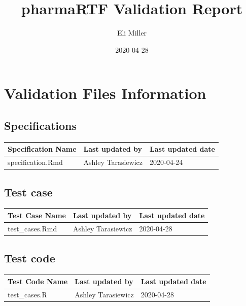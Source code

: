 \documentclass[]{article}
\title{pharmaRTF Validation Report}
\author{Eli Miller}
\date{2020-04-28}
\begin{document}
\maketitle

\newpage
\tableofcontents
\newpage

\hypertarget{validation-files-information}{%
\section{Validation Files
Information}\label{validation-files-information}}

\hypertarget{specifications}{%
\subsection{Specifications}\label{specifications}}

\begin{table}[H]
\centering
\begin{tabular}{lll}
\toprule
Specification Name & Last updated by & Last updated date\\
\midrule
\rowcolor{gray!6}  specification.Rmd & Ashley Tarasiewicz & 2020-04-24\\
\bottomrule
\end{tabular}
\end{table}

\hypertarget{test-case}{%
\subsection{Test case}\label{test-case}}

\begin{table}[H]
\centering
\begin{tabular}{lll}
\toprule
Test Case Name & Last updated by & Last updated date\\
\midrule
\rowcolor{gray!6}  test\_cases.Rmd & Ashley Tarasiewicz & 2020-04-28\\
\bottomrule
\end{tabular}
\end{table}

\hypertarget{test-code}{%
\subsection{Test code}\label{test-code}}

\begin{table}[H]
\centering
\begin{tabular}{lll}
\toprule
Test Code Name & Last updated by & Last updated date\\
\midrule
\rowcolor{gray!6}  test\_cases.R & Ashley Tarasiewicz & 2020-04-28\\
\bottomrule
\end{tabular}
\end{table}
\end{document}
